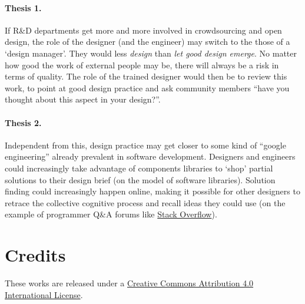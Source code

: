 \documentclass{article}
\begin{document}
\paragraph{Thesis 1.}If R\&D departments get more and more involved in crowdsourcing and open design, the role of the designer (and the engineer) may switch to the those of a `design manager'. They would less \emph{design} than \emph{let good design emerge}. No matter how good the work of external people may be, there will always be a risk in terms of quality. The role of the trained designer would then be to review this work, to point at good design practice and ask community members ``have you thought about this aspect in your design?''.

\paragraph{Thesis 2.}Independent from this, design practice may get closer to some kind of ``google engineering'' already prevalent in software development. Designers and engineers could increasingly take advantage of components libraries to `shop' partial solutions to their design brief (on the model of software libraries). Solution finding could increasingly happen online, making it possible for other designers to retrace the collective cognitive process and recall ideas they could use (on the example of programmer Q\&A forums like \href{https://en.wikipedia.org/wiki/Stack_Overflow}{Stack Overflow}).

\begin{comment}
{\color{red}Die OSPE ist einerseits gekennzeichnet durch eine evolutionäre Entwicklung von OSH-Produkten auf Basis unabhängig voneinander geleisteter Weiterentwicklungen und andererseits der Koordination und Integration verteilter Entwicklungsbeiträge. Unterstützende Software (wie z.B. kollaborative CAD-Software) und eine modulare Produktarchitektur senken den Aufwand für manuelle Integration auf ein möglichst geringes Niveau. Die Zusammenführung von Beiträgen aus dem verteilten Entwicklungsprozess zur Veröffentlichung einer offiziellen Produktversion erfolgt zentral durch einen festgelegten Zuständigen, der jeweils die am besten geeigneten Entwicklungslösungen auswählt und integriert. > products are modular (even maybe open architecture products), designer is integrator}
\end{comment}

\section*{Credits}
\label{sec:credits}
These works are released under a \href{https://creativecommons.org/licenses/by/4.0/}{Creative Commons Attribution 4.0 International License}. 
\end{document}
